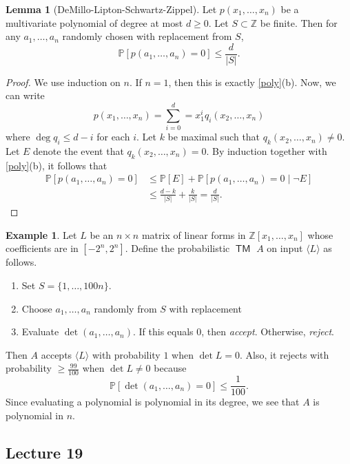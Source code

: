 \documentclass[10pt,letterpaper,cm]{nupset}
\theoremstyle{definition}
\newtheorem{exmp}[definition]{Example}
\theoremstyle{theorem}
\newtheorem{lemma}[definition]{Lemma}
\theoremstyle{remark}
\newcommand{\Z}{\mathbb Z}
\newcommand{\1}{\mathbf{1}}
\newcommand{\0}{\vec 0}
\DeclareMathOperator{\TM}{\mathsf{TM}}
\begin{document}
\begin{lemma}[DeMillo-Lipton-Schwartz-Zippel]
Let $p(x_1, \ldots, x_n)$ be a multivariate polynomial of degree at most $d\geq 0$. Let $S \subset \Z$ be finite. Then for any $a_1, \ldots, a_n$ randomly chosen with replacement from $S$, $$\mathbb{P}[p(a_1, \ldots, a_n) =0] \leq \frac{d}{|S|}.$$
\end{lemma}
\begin{proof}
We use induction on $n$. If $n=1$, then this is exactly \cref{poly}(b). Now, we can write $$p(x_1, \ldots, x_n) = \sum_{i=0}^d = x_1^i q_i(x_2, \ldots, x_n)$$ where $\deg{q_i} \leq d-i$ for each $i$. Let $k$ be maximal such that $q_k(x_2, \ldots, x_n) \ne 0$. Let $E$ denote the event that $q_k(x_2, \ldots, x_n) =0$. 
By induction together with \cref{poly}(b), it follows that  
\begin{align*} \mathbb{P}\left[p(a_1, \ldots, a_n) =0\right] & \leq \mathbb{P}[E] + \mathbb{P}[p(a_1, \ldots, a_n) =0 \mid \neg{E}]
\\ & \leq \frac{d-k}{|S|} + \frac{k}{|S|} = \frac{d}{|S|}.
\end{align*}
\end{proof}

\begin{exmp}\label{matrix}
Let $L$ be an $n \times n$ matrix of linear forms in $\Z[x_1, \ldots, x_n]$ whose coefficients are in $[{-}2^n, 2^n]$. Define the probabilistic $\TM$ $A$ on input $\langle L \rangle$ as follows. 
\begin{enumerate}
\item Set $S = \{1, \ldots, 100n\}$.
\item Choose $a_1, \ldots, a_n$ randomly from $S$ with replacement
\item Evaluate $\det(a_1, \ldots, a_n)$.  If this equals $0$, then \textit{accept}. Otherwise, \textit{reject}.
\end{enumerate}
Then $A$ accepts $\langle L \rangle$ with probability $1$ when $\det{L} = 0$. Also, it rejects with probability $\geq \frac{99}{100}$ when $\det{L} \ne 0$ because $$\mathbb{P}[\det(a_1, \ldots, a_n) =0] \leq \frac{1}{100}.$$ Since evaluating a polynomial is polynomial in its degree, we see that $A$ is polynomial in $n$.
\end{exmp}

\subsection{Lecture 19}
\end{document}
